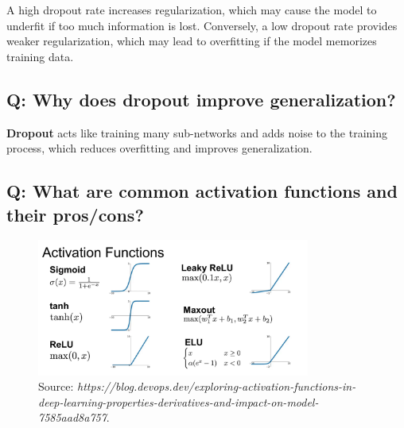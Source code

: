 A high dropout rate increases regularization, which may cause the model to underfit if too much information is lost. Conversely, a low dropout rate provides weaker regularization, which may lead to overfitting if the model memorizes training data.

\subsection*{Q: Why does dropout improve generalization?}
\textbf{Dropout} acts like training many sub-networks and adds noise to the training process, which reduces overfitting and improves generalization.

\subsection*{Q: What are common activation functions and their pros/cons?}
\begin{figure}[H]
	\centering
	\includegraphics[width=0.8\textwidth]{activation.png}
	\caption{Source: \textit{https://blog.devops.dev/exploring-activation-functions-in-deep-learning-properties-derivatives-and-impact-on-model-7585aad8a757}.}
\end{figure}

